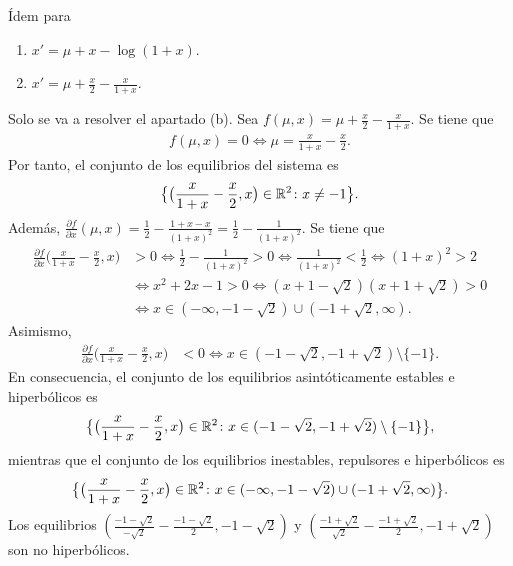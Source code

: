 \documentclass[11pt]{report}
\begin{document}
\begin{exercise}
    Ídem para
    \begin{enumerate}
        \item $x' = \mu + x - \log(1+x)$.
        \item $x' = \mu + \frac{x}{2} - \frac{x}{1+x}$.
    \end{enumerate}
\end{exercise}

\begin{solution}
    Solo se va a resolver el apartado (b). Sea $f(\mu,x) = \mu+\frac{x}{2}-\frac{x}{1+x}$. Se tiene que
    \begin{align*}
        f(\mu,x) = 0 \iff \mu = \frac{x}{1+x}-\frac{x}{2}.
    \end{align*}
    Por tanto, el conjunto de los equilibrios del sistema es
    \[\bigl\{\bigl(\frac{x}{1+x}-\frac{x}{2},x\bigr) \in\mathbb R^2 \colon x \neq -1\bigr\}.\]
    Además, $\frac{\partial f}{\partial x}(\mu,x) = \frac{1}{2}-\frac{1+x-x}{(1+x)^2} = \frac{1}{2}-\frac{1}{(1+x)^2}$. Se tiene que
    \begin{align*}
        \frac{\partial f}{\partial x}\bigl(\frac{x}{1+x}-\frac{x}{2},x\bigr) &> 0 \iff \frac{1}{2}-\frac{1}{(1+x)^2} > 0 \iff \frac{1}{(1+x)^2} < \frac{1}{2} \iff (1+x)^2 > 2 \\
        &\iff x^2+2x-1 > 0 \iff (x+1-\sqrt{2})(x+1+\sqrt{2}) > 0 \\
        &\iff x \in (-\infty,-1-\sqrt{2}) \cup(-1+\sqrt{2},\infty).
    \end{align*}
    Asimismo,
    \begin{align*}
        \frac{\partial f}{\partial x}\bigl(\frac{x}{1+x}-\frac{x}{2},x\bigr) &< 0 \iff x \in (-1-\sqrt{2},-1+\sqrt{2}) \setminus\{-1\}.
    \end{align*}
    En consecuencia, el conjunto de los equilibrios asintóticamente estables e hiperbólicos es
    \[\bigl\{\bigl(\frac{x}{1+x}-\frac{x}{2},x\bigr) \in\mathbb R^2 \colon x\in (-1-\sqrt{2},-1+\sqrt{2}) \setminus\{-1\} \bigr\},\]
    mientras que el conjunto de los equilibrios inestables, repulsores e hiperbólicos es
    \[\bigl\{\bigl(\frac{x}{1+x}-\frac{x}{2},x\bigr) \in\mathbb R^2 \colon x \in (-\infty,-1-\sqrt{2}) \cup(-1+\sqrt{2},\infty) \bigr\}.\]
    Los equilibrios $(\frac{-1-\sqrt{2}}{-\sqrt{2}}-\frac{-1-\sqrt{2}}{2}, -1-\sqrt{2})$ y $(\frac{-1+\sqrt{2}}{\sqrt{2}}-\frac{-1+\sqrt{2}}{2}, -1+\sqrt{2})$ son no hiperbólicos.
    \begin{figure}[H]
        \centering

\end{figure}
\end{solution}
\end{document}
